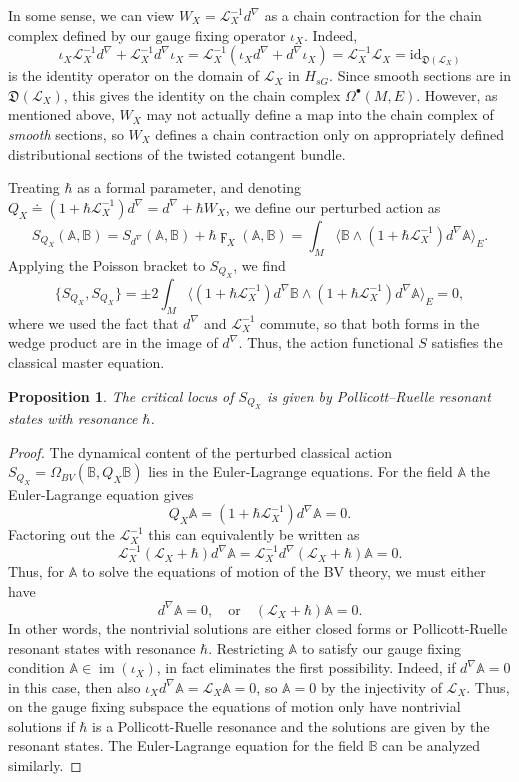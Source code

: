 \documentclass[reqno]{amsart}
\newtheorem{prop}[thm]{Proposition}
\theoremstyle{definition}
\theoremstyle{remark}
\newcommand{\A}{\mathbb{A}}
\newcommand{\B}{\mathbb{B}}
\renewcommand{\d}{d^\nabla}
\newcommand{\h}{\hbar}
\renewcommand{\L}{\mathcal{L}}
\DeclareMathOperator{\im}{im}
\begin{document}
\begin{rmk}
In some sense, we can view $W_X=\L_X^{-1}\d$ as a chain contraction for the chain complex defined by our gauge fixing operator $\iota_X$. Indeed, 
$$\iota_X\L_X^{-1}\d + \L_X^{-1}\d\iota_X = \L_X^{-1}(\iota_X\d + \d\iota_X) = \L_X^{-1}\L_X = \mathrm{id}_{\mathfrak{D}(\L_X)}$$
is the identity operator on the domain of $\L_X$ in $H_{sG}$.
Since smooth sections are in $\mathfrak{D}(\L_X)$, this gives the identity on the chain complex $\Omega^\bullet(M,E)$. However, as mentioned above, $W_X$ may not actually define a map into the chain complex of \emph{smooth} sections, so $W_X$ defines a chain contraction only on appropriately defined distributional sections of the twisted cotangent bundle.
\end{rmk}

Treating $\h$ as a formal parameter, and denoting $Q_X \doteq (1 + \hbar \L_X^{-1})\d = \d +\hbar W_X$, we define our perturbed action as
\begin{equation}
\label{full_action}
S_{Q_X}(\A,\B) = S_{\d}(\A,\B) + \h \digamma_X(\A,\B) = \int_M \langle\B\wedge(1+\h\L_X^{-1})\d\A\rangle_E.
\end{equation}
Applying the Poisson bracket to $S_{Q_X}$, we find
\begin{equation*}
    \{S_{Q_X},S_{Q_X}\} = \pm 2\int_M \langle(1+\h\L_X^{-1})\d\B\wedge(1+\h\L_X^{-1})\d\A\rangle_E = 0,
\end{equation*}
where we used the fact that $\d$ and $\L_X^{-1}$ commute, so that both forms in the wedge product are in the image of $\d$. Thus, the action functional $S$ satisfies the classical master equation.

\begin{prop}
    The critical locus of $S_{Q_X}$ is given by Pollicott--Ruelle resonant states with resonance $\hbar$.
\end{prop}
\begin{proof}
The dynamical content of the perturbed classical action $S_{Q_X}=\Omega_{BV}(\B,Q_X\B)$ lies in the Euler-Lagrange equations. For the field $\A$ the Euler-Lagrange equation gives
$$Q_X\A=(1+\h\L_X^{-1})\d\A = 0.$$
Factoring out the $\L_X^{-1}$ this can equivalently be written as
$$\L_X^{-1}(\L_X+\h)\d\A = \L_X^{-1}\d(\L_X+\h)\A = 0.$$
Thus, for $\A$ to solve the equations of motion of the BV theory, we must either have
$$\d\A = 0, \quad\mathrm{or}\quad (\L_X+\h)\A = 0.$$
In other words, the nontrivial solutions are either closed forms or Pollicott-Ruelle resonant states with resonance $\h$. Restricting $\A$ to satisfy our gauge fixing condition $\A \in \im(\iota_X)$, in fact eliminates the first possibility. Indeed, if $\d\A = 0$ in this case, then also $\iota_X\d\A = \L_X\A = 0$, so $\A=0$ by the injectivity of $\L_X$. Thus, on the gauge fixing subspace the equations of motion only have nontrivial solutions if $\h$ is a Pollicott-Ruelle resonance and the solutions are given by the resonant states. The Euler-Lagrange equation for the field $\B$ can be analyzed similarly.
\end{proof}
\end{document}
